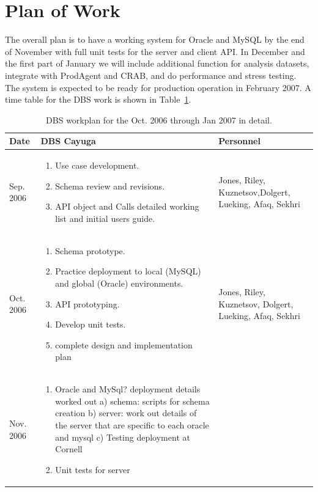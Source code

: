 \documentclass{cmspaper}
\begin{document}
\section{Plan of Work}
The overall plan is to have a working system for Oracle and MySQL by the end of November with full unit tests for the server and client API. In December and the first  part of January we will include additional function for analysis datasets, integrate with ProdAgent and CRAB,  and do performance and stress testing. The system  is expected to be ready for production operation in February 2007.
A time table for the DBS work is shown in Table~\ref{tab:dbs-work-plan}.
\begin{table}[htb]
    \caption{DBS workplan for the Oct. 2006 through Jan 2007 in detail.  }
    \label{tab:dbs-work-plan}
    \begin{center}
     \begin{tabular}{|l|p{4.5in}|p{1.0in}|} \hline 
Date & DBS Cayuga & Personnel  \\ \hline
Sep. 2006 & 
\begin{enumerate}
 \item Use case development.
 \item Schema review and revisions.
 \item API object and Calls detailed working list and initial users guide.
\end{enumerate} & Jones, Riley, Kuznetsov,Dolgert,  Lueking, Afaq, Sekhri  \\ \hline
Oct. 2006  & 
\begin{enumerate}
 \item Schema prototype.
 \item Practice deployment to local (MySQL) and global (Oracle) environments. 
 \item API prototyping.
 \item Develop unit tests. 
 \item complete design and implementation plan
\end{enumerate}& Jones, Riley, Kuznetsov, Dolgert,  Lueking, Afaq, Sekhri \\ \hline
Nov. 2006  & 
\begin{enumerate}
  \item  Oracle and MySql? deployment details worked out
         a) schema: scripts for schema creation
         b) server: work out details of the server that are specific to each oracle and mysql
         c) Testing deployment at Cornell 
  \item  Unit tests for server

\end{enumerate}
\end{tabular}
\end{center}
\end{table}
\end{document}
